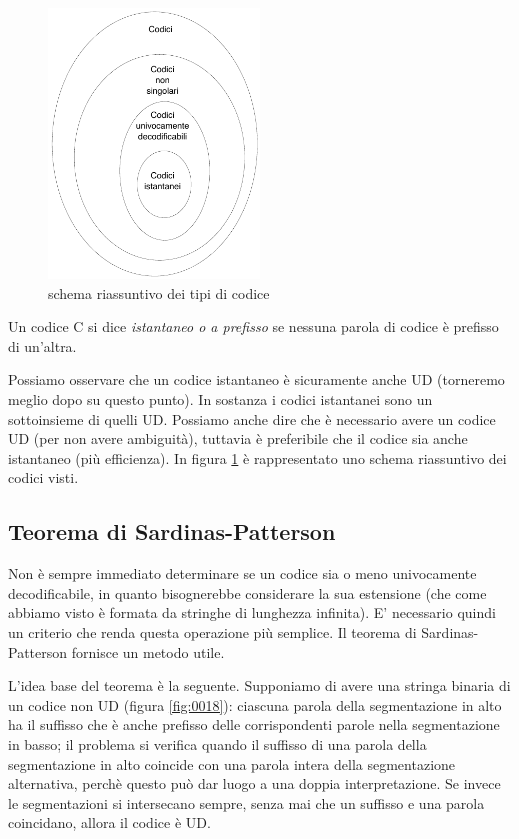 \begin{figure}[htbp]
\begin{center}
	\includegraphics[width=0.5\textwidth]{img/codici.pdf}
\caption{schema riassuntivo dei tipi di codice}
\label{fig:0004}
\end{center}
\end{figure}


\begin{definizione}
Un codice C si dice \textit{istantaneo o a prefisso} se nessuna parola di codice è prefisso di un'altra.
\end{definizione}
Possiamo osservare che un codice istantaneo è sicuramente anche UD (torneremo meglio dopo su questo punto). In sostanza i codici 
istantanei sono un sottoinsieme di quelli UD. Possiamo anche dire che è necessario avere un codice UD (per non avere ambiguità), tuttavia è preferibile che il codice sia anche istantaneo (più efficienza).
In figura \ref{fig:0004} è rappresentato uno schema riassuntivo dei codici visti.





\subsection{Teorema di Sardinas-Patterson}
Non è sempre immediato determinare se un codice sia o meno univocamente decodificabile, in quanto bisognerebbe considerare la sua estensione (che come abbiamo visto è formata da stringhe di lunghezza infinita).
E' necessario quindi un criterio che renda questa operazione più semplice. Il teorema di Sardinas-Patterson fornisce un metodo utile.

L'idea base del teorema è la seguente. Supponiamo di avere una stringa binaria di un codice non UD (figura \ref{fig:0018}): ciascuna parola della segmentazione in alto ha il suffisso che è anche prefisso delle corrispondenti parole nella segmentazione in basso; il problema si verifica quando il suffisso di una parola della segmentazione in alto coincide con una parola intera della segmentazione alternativa, perchè questo può dar luogo a una doppia interpretazione. Se invece le segmentazioni si intersecano sempre, senza mai che un suffisso e una parola coincidano, allora il codice è UD.


